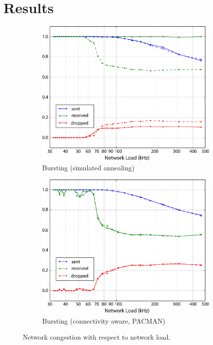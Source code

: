 \documentclass[oneside, a4paper, 11pt]{memoir}
\begin{document}
\section{Results}

\begin{figure}[b]
	\begin{subfigure}{.5\linewidth}
		\centering
		\includegraphics[width=0.9\linewidth]{images/bursting3.pdf}
		\caption{Bursting (simulated annealing)}
		\label{fig:bursting}
	\end{subfigure}
	\begin{subfigure}{.5\linewidth}
		\centering
		\includegraphics[width=0.9\linewidth]{images/bursting_connaware3.pdf}
		\caption{Bursting (connectivity aware, PACMAN)}	
		\label{fig:bursting_aware}
	\end{subfigure}
	\caption{Network congestion with respect to network load.}
	\label{fig:congestion}
\end{figure}
\end{document}
